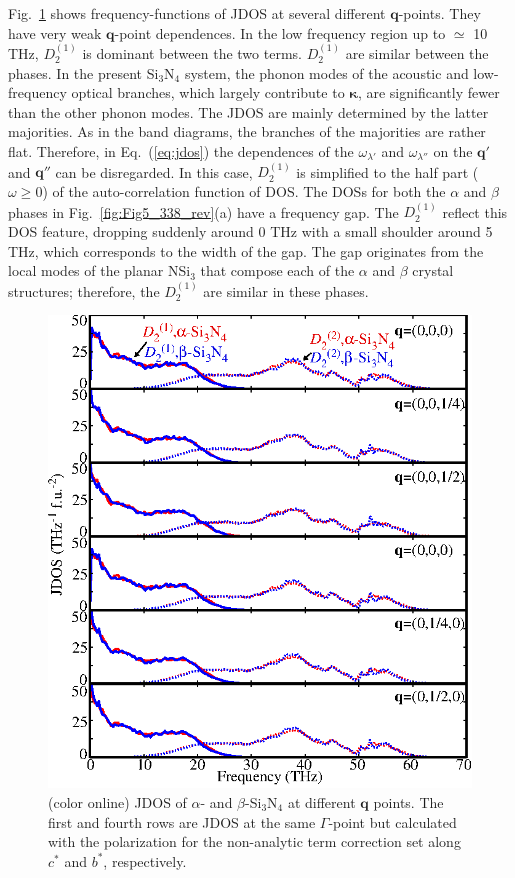 \documentclass[twocolumn,amsmath,amssymb,a4paper,prb,superscriptaddress,floatfix]{revtex4-1}
\begin{document}
Fig.~\ref{fig:Fig6_338} shows frequency-functions of JDOS at several different
$\mathbf{q}$-points. They have very weak $\mathbf{q}$-point dependences. In the
low frequency region up to $\simeq$ 10 THz, $D_2^{(1)}$ is dominant between the
two terms. $D_2^{(1)}$ are similar between the phases. In the present
Si$_3$N$_4$ system, the phonon modes of the acoustic and low-frequency optical
branches, which largely contribute to $\boldsymbol{\kappa}$, are significantly
fewer than the other phonon modes. The JDOS are mainly determined by the latter
majorities.  As in the band diagrams, the branches of the majorities are rather
flat.  Therefore, in Eq.~(\ref{eq:jdos}) the dependences of the
$\omega_{\lambda'}$ and $\omega_{\lambda''}$ on the $\mathbf{q}'$ and
$\mathbf{q}''$ can be disregarded. In this case, $D_2^{(1)}$ is simplified to
the half part ($\omega \geq  0$) of the auto-correlation function of DOS. The
DOSs for both the $\alpha$ and $\beta$ phases in Fig.~\ref{fig:Fig5_338_rev}(a)
have a frequency gap. The $D_2^{(1)}$ reflect this DOS feature, dropping
suddenly around 0 THz with a small shoulder around 5 THz, which corresponds to
the width of the gap.  The gap originates from the local modes of the planar
NSi$_3$ that compose each of the $\alpha$ and $\beta$ crystal
structures;\cite{kuwabara} therefore, the $D_2^{(1)}$ are similar in these
phases.  

\begin{figure}[ht]
 \centering
  \includegraphics[width=0.9\linewidth]{figure_jdoss.eps} \caption{(color
	  online) JDOS of $\alpha$- and $\beta$-Si$_3$N$_4$ at different $\mathbf q$ points.
  The first and fourth rows are JDOS at the same $\Gamma$-point but calculated
  with the polarization for the non-analytic term correction set along $c^*$ and
  $b^*$, respectively. \label{fig:Fig6_338} }
 \centering
\end{figure}
\end{document}
